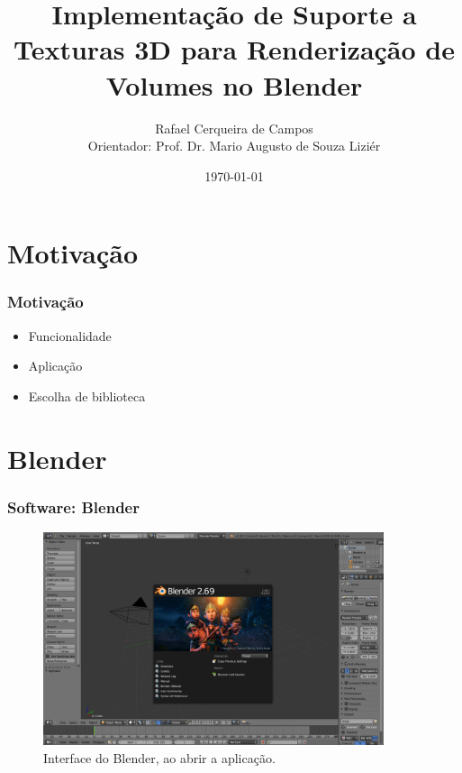 \documentclass{beamer}
\title[Defesa]{Implementação de Suporte a Texturas 3D para Renderização de
Volumes no Blender}
\author[Rafael Campos]{Rafael Cerqueira de Campos \\ Orientador: Prof. Dr. Mario Augusto de Souza Liziér}
\institute[DC - UFSCAR]{Graduação em Engenharia de Computação - UFSCar}
\date{\today}
\begin{document}
\frame{\titlepage}

\AtBeginSubsection[]

\begin{frame}[allowframebreaks]
\tableofcontents
\end{frame}

\section{Motivação}

\begin{frame}

\frametitle{Motivação}
\begin{itemize}
\item Funcionalidade
\item Aplicação
\item Escolha de biblioteca
\end{itemize}

\end{frame}

\section{Blender}

\begin{frame}

\frametitle{Software: Blender}

\begin{figure}[!htb]
\center
\includegraphics[width=10cm]{blender_gui}
\caption{Interface do Blender, ao abrir a aplicação.}
\end{figure}


\end{frame}
\end{document}
